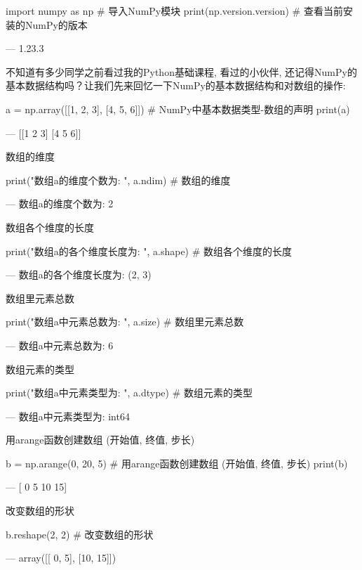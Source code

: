 \begin{python}
import numpy as np    # 导入NumPy模块
print(np.version.version)   # 查看当前安装的NumPy的版本

---
1.23.3
\end{python}

不知道有多少同学之前看过我的Python基础课程, 看过的小伙伴, 还记得NumPy的基本数据结构吗？让我们先来回忆一下NumPy的基本数据结构和对数组的操作: 

\begin{python}
a = np.array([[1, 2, 3], [4, 5, 6]])   # NumPy中基本数据类型-数组的声明
print(a)

---
[[1 2 3]
 [4 5 6]]
\end{python}

数组的维度

\begin{python}
print("数组a的维度个数为: ", a.ndim)  # 数组的维度

---
数组a的维度个数为:  2
\end{python}

数组各个维度的长度

\begin{python}
print("数组a的各个维度长度为: ", a.shape)  # 数组各个维度的长度

---
数组a的各个维度长度为:  (2, 3)
\end{python}

数组里元素总数

\begin{python}
print("数组a中元素总数为: ", a.size)  # 数组里元素总数

---
数组a中元素总数为:  6
\end{python}

数组元素的类型

\begin{python}
print("数组a中元素类型为: ", a.dtype)  # 数组元素的类型

---
数组a中元素类型为:  int64
\end{python}

用arange函数创建数组 (开始值, 终值, 步长)

\begin{python}
b = np.arange(0, 20, 5)     # 用arange函数创建数组 (开始值, 终值, 步长)
print(b)

---
[ 0  5 10 15]
\end{python}

改变数组的形状

\begin{python}
b.reshape(2, 2)         # 改变数组的形状

---
array([[ 0,  5],
       [10, 15]])
\end{python}

